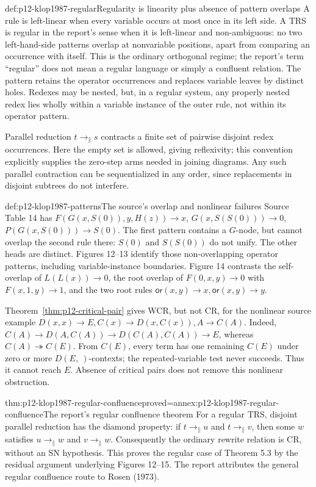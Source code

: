 \begin{hbdefinition}{def:p12-klop1987-regular}{Regularity is linearity plus absence of pattern overlaps}
A rule is left-linear when every variable occurs at most once in its left
side. A TRS is regular in the report's sense when it is left-linear and
non-ambiguous: no two left-hand-side patterns overlap at nonvariable
positions, apart from comparing an occurrence with itself.
This is the ordinary orthogonal regime; the report's term ``regular'' does
not mean a regular language or simply a confluent relation.
The pattern retains the operator occurrences and replaces variable leaves
by distinct holes. Redexes may be nested, but, in a regular system, any
properly nested redex lies wholly within a variable instance of the outer
rule, not within its operator pattern.

Parallel reduction \(t\to_{\parallel}s\) contracts a finite set of
pairwise disjoint redex occurrences. Here the empty set is allowed, giving
reflexivity; this convention explicitly supplies the zero-step arms needed
in joining diagrams. Any such parallel contraction can be sequentialized
in any order, since replacements in disjoint subtrees do not interfere.
\end{hbdefinition}

\begin{hbexample}{def:p12-klop1987-patterns}{The source's overlap and nonlinear failures}
Source Table 14 has
\(F(G(x,S(0)),y,H(z))\to x\),
\(G(x,S(S(0)))\to0\), \(P(G(x,S(0)))\to S(0)\).
The first pattern contains a \(G\)-node, but cannot overlap the second
rule there: \(S(0)\) and \(S(S(0))\) do not unify. The other heads
are distinct. Figures 12--13 identify those non-overlapping operator
patterns, including variable-instance boundaries. Figure 14 contrasts
the self-overlap of \(L(L(x))\to0\), the root overlap of
\(F(0,x,y)\to0\) with \(F(x,1,y)\to1\), and the two root
rules \(\mathsf{or}(x,y)\to x,\mathsf{or}(x,y)\to y\).

Theorem~\ref{thm:p12-critical-pair} gives WCR, but not CR, for the
nonlinear source example
\(D(x,x)\to E,C(x)\to D(x,C(x)),A\to C(A)\).
Indeed,
\(C(A)\to D(A,C(A))\to D(C(A),C(A))\to E\), whereas
\(C(A)\twoheadrightarrow C(E)\). From \(C(E)\), every term has
one remaining \(C(E)\) under zero or more \(D(E,\ )\)-contexts;
the repeated-variable test never succeeds. Thus it cannot reach \(E\).
Absence of critical pairs does not remove this nonlinear obstruction.
\end{hbexample}

\begin{hbtheorem}{thm:p12-klop1987-regular-confluence}{proved=annex:p12-klop1987-regular-confluence}{The report's regular confluence theorem}
For a regular TRS, disjoint parallel reduction has the diamond property:
if \(t\to_{\parallel}u\) and \(t\to_{\parallel}v\), then some
\(w\) satisfies \(u\to_{\parallel}w\) and
\(v\to_{\parallel}w\). Consequently the ordinary rewrite relation
is CR, without an SN hypothesis. This proves the regular case of
Theorem 5.3 by the residual argument underlying Figures 12--15.
The report attributes the general regular confluence route to Rosen (1973).
\end{hbtheorem}

